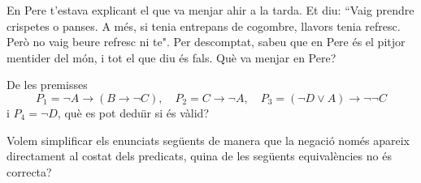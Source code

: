 \begin{enumerate}
\begin{enumerate}
{}
\end{enumerate}
\feedback

\pregunta En Pere t'estava explicant el que va menjar ahir a la tarda. Et diu:
\textquotedblleft Vaig prendre crispetes o panses. A m\'{e}s, si tenia
entrepans de cogombre, llavors tenia refresc. Per\`{o} no vaig beure refresc
ni te". Per descomptat, sabeu que en Pere \'{e}s el pitjor mentider del
m\'{o}n, i tot el que diu \'{e}s fals. Qu\`{e} va menjar en Pere?

\begin{enumerate}
\end{enumerate}
\feedback

\pregunta De les premisses
\[
P_{1}=\lnot A\longrightarrow\left( B\longrightarrow\lnot C\right),\quad
P_{2}=C\longrightarrow\lnot A,\quad
P_{3}=\left( \lnot D\vee A\right) \longrightarrow\lnot\lnot C
\]
i $P_{4}=\lnot D$, qu\`{e} es pot dedu\"{\i}r si \'{e}s v\`{a}lid?

\begin{enumerate}
\end{enumerate}
\feedback

\pregunta Volem simplificar els enunciats seg\"{u}ents de manera que la
negaci\'{o} nom\'{e}s apareix directament al costat dels predicats, quina de les
seg\"{u}ents equival\`{e}ncies no \'{e}s correcta?

\begin{enumerate}
\end{enumerate}
\end{enumerate}
